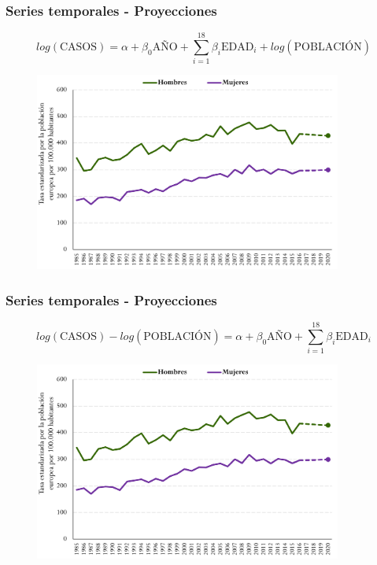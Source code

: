 \documentclass{beamer}
\begin{document}
\begin{frame}\frametitle{Series temporales - Proyecciones}
	\vspace{-20pt}
	\centering
	$$log(\text{CASOS}) = \alpha + \beta_0 \text{AÑO} + \sum_{i = 1}^{18} \beta_i \text{EDAD}_i + log(\text{POBLACIÓN})$$
	\vspace{-10pt}
	\begin{figure}
		\centering
		\includegraphics[width=0.9\textwidth]{images/proyecciones1.png}
	\end{figure}
\end{frame}


\begin{frame}\frametitle{Series temporales - Proyecciones}
	\vspace{-20pt}
	\centering
	$$log(\text{CASOS}) - log(\text{POBLACIÓN}) = \alpha + \beta_0 \text{AÑO} + \sum_{i = 1}^{18} \beta_i \text{EDAD}_i $$
	\vspace{-10pt}
	\begin{figure}
		\centering
		\includegraphics[width=0.9\textwidth]{images/proyecciones1.png}
	\end{figure}
\end{frame}
\end{document}
